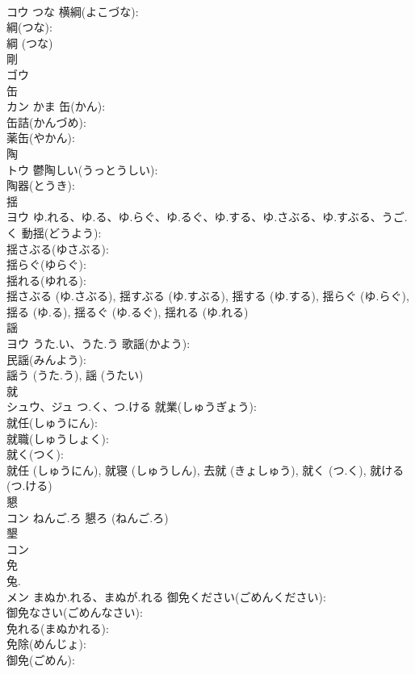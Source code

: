 \documentclass[8pt]{extreport}
\begin{document}
\begin{CJK}{UTF8}{min}
\\	コウ	つな	横綱(よこづな): 
\\	綱(つな): 
\\	綱 (つな)
\\	剛			
\\	ゴウ			
\\	缶			
\\	カン	かま	缶(かん): 
\\	缶詰(かんづめ): 
\\	薬缶(やかん): 
\\	陶			
\\	トウ		鬱陶しい(うっとうしい): 
\\	陶器(とうき): 
\\	揺			
\\	ヨウ	ゆ.れる、ゆ.る、ゆ.らぐ、ゆ.るぐ、ゆ.する、ゆ.さぶる、ゆ.すぶる、うご.く	動揺(どうよう): 
\\	揺さぶる(ゆさぶる): 
\\	揺らぐ(ゆらぐ): 
\\	揺れる(ゆれる): 
\\	揺さぶる (ゆ.さぶる), 揺すぶる (ゆ.すぶる), 揺する (ゆ.する), 揺らぐ (ゆ.らぐ), 揺る (ゆ.る), 揺るぐ (ゆ.るぐ), 揺れる (ゆ.れる)
\\	謡			
\\	ヨウ	うた.い、うた.う	歌謡(かよう): 
\\	民謡(みんよう): 
\\	謡う (うた.う), 謡 (うたい)
\\	就			
\\	シュウ、ジュ	つ.く、つ.ける	就業(しゅうぎょう): 
\\	就任(しゅうにん): 
\\	就職(しゅうしょく): 
\\	就く(つく): 
\\	就任 (しゅうにん), 就寝 (しゅうしん), 去就 (きょしゅう), 就く (つ.く), 就ける (つ.ける)
\\	懇			
\\	コン	ねんご.ろ		懇ろ (ねんご.ろ)
\\	墾			
\\	コン			
\\	免			
\\	兔.	
\\	メン	まぬか.れる、まぬが.れる	御免ください(ごめんください): 
\\	御免なさい(ごめんなさい): 
\\	免れる(まぬかれる): 
\\	免除(めんじょ): 
\\	御免(ごめん): 

\end{CJK}
\end{document}
